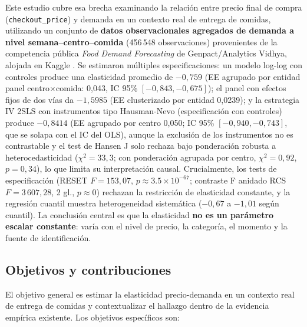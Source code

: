 \documentclass[doc, a4paper, biblatex, floatsintext, longtable, babel]{apa7}
\begin{document}
Este estudio cubre esa brecha examinando la relación entre precio final de compra (\texttt{checkout\_price}) y demanda en un contexto real de entrega de comidas, utilizando un conjunto de \textbf{datos observacionales agregados de demanda a nivel semana--centro--comida} (456\,548 observaciones) provenientes de la competencia p\'ublica \textit{Food Demand Forecasting} de Genpact/Analytics Vidhya, alojada en Kaggle \parencite{kaggle_food_demand}. Se estimaron múltiples especificaciones: un modelo log-log con controles produce una elasticidad promedio de $-0,759$ (EE agrupado por entidad panel centro$\times$comida: 0,043, IC 95\% $[ -0,843, -0,675 ]$); el panel con efectos fijos de dos vías da $-1,5985$ (EE clusterizado por entidad 0,0239); y la estrategia IV 2SLS con instrumentos tipo Hausman-Nevo (especificación con controles) produce $-0,8414$ (EE agrupado por centro 0,050; IC 95\% $[-0,940, -0,743]$, que se solapa con el IC del OLS), aunque la exclusión de los instrumentos no es contrastable y el test de Hansen J solo rechaza bajo ponderación robusta a heterocedasticidad ($\chi^2=33,3$; con ponderación agrupada por centro, $\chi^2=0,92$, $p=0,34$), lo que limita su interpretaci\'on causal. Crucialmente, los tests de especificación (RESET $F=153,07$, $p \approx 3.5 \times 10^{-67}$; contraste F anidado RCS $F=3\,607,28$, 2 gl., $p \approx0$) rechazan la restricción de elasticidad constante, y la regresión cuantil muestra heterogeneidad sistemática ($-0,67$ a $-1,01$ según cuantil). La conclusión central es que la elasticidad \textbf{no es un parámetro escalar constante}: varía con el nivel de precio, la categoría, el momento y la fuente de identificación.

\subsection{Objetivos y contribuciones}
\label{sec:objetivos}

El objetivo general es estimar la elasticidad precio-demanda en un contexto real de entrega de comidas y contextualizar el hallazgo dentro de la evidencia emp\'irica existente. Los objetivos espec\'ificos son:
\end{document}
